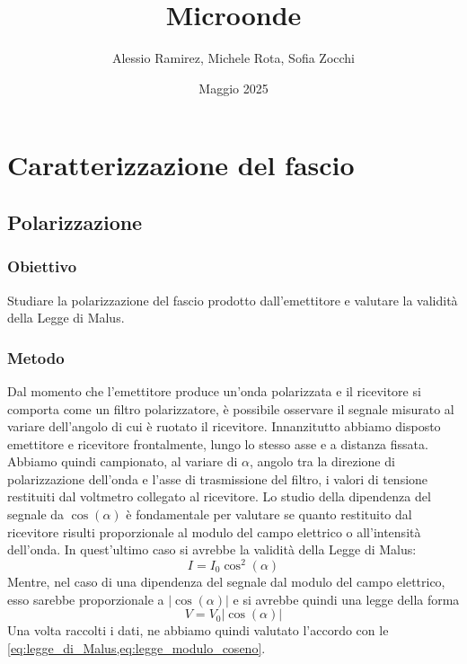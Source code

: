 \documentclass[a4paper]{article}
\title{Microonde}
\author{Alessio Ramirez, Michele Rota, Sofia Zocchi}
\date{Maggio 2025} %
\begin{document}
\maketitle
\section{Caratterizzazione del fascio}
\subsection{Polarizzazione}
\subsubsection{Obiettivo}
Studiare la polarizzazione del fascio prodotto dall'emettitore e valutare la validità della Legge di Malus.

\subsubsection{Metodo}
Dal momento che l'emettitore produce un'onda polarizzata e il ricevitore si comporta come un filtro polarizzatore, 
è possibile osservare il segnale misurato al variare dell'angolo di cui è ruotato il ricevitore.
Innanzitutto abbiamo disposto emettitore e ricevitore frontalmente, lungo lo stesso asse e a distanza fissata. 
Abbiamo quindi campionato, al variare di $\alpha$, angolo tra la direzione di polarizzazione dell'onda e l'asse di trasmissione del filtro, 
i valori di tensione restituiti dal voltmetro collegato al ricevitore. 
Lo studio della dipendenza del segnale da $\cos(\alpha)$ è fondamentale per valutare se quanto restituito dal ricevitore risulti proporzionale al modulo del campo elettrico o all'intensità dell'onda. 
In quest'ultimo caso si avrebbe la validità della Legge di Malus:
\begin{equation}
I = I_0 \cos^2(\alpha)
\label{eq:legge_di_Malus}
\end{equation}
Mentre, nel caso di una dipendenza del segnale dal modulo del campo elettrico, esso sarebbe proporzionale a $|\cos(\alpha)|$  
e si avrebbe quindi una legge della forma
\begin{equation}
V = V_0|\cos(\alpha)|
\label{eq:legge_modulo_coseno}
\end{equation}
Una volta raccolti i dati, ne abbiamo quindi valutato l'accordo con le \cref{eq:legge_di_Malus,eq:legge_modulo_coseno}.
\end{document}
